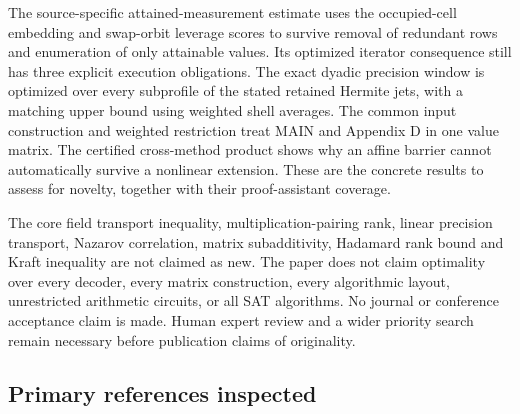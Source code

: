 \documentclass[
  11pt,
]{article}
\begin{document}
The source-specific attained-measurement estimate uses the occupied-cell
embedding and swap-orbit leverage scores to survive removal of redundant
rows and enumeration of only attainable values. Its optimized iterator
consequence still has three explicit execution obligations. The exact
dyadic precision window is optimized over every subprofile of the stated
retained Hermite jets, with a matching upper bound using weighted shell
averages. The common input construction and weighted restriction treat
MAIN and Appendix D in one value matrix. The certified cross-method
product shows why an affine barrier cannot automatically survive a
nonlinear extension. These are the concrete results to assess for
novelty, together with their proof-assistant coverage.

The core field transport inequality, multiplication-pairing rank, linear
precision transport, Nazarov correlation, matrix subadditivity, Hadamard
rank bound and Kraft inequality are not claimed as new. The paper does
not claim optimality over every decoder, every matrix construction,
every algorithmic layout, unrestricted arithmetic circuits, or all SAT
algorithms. No journal or conference acceptance claim is made. Human
expert review and a wider priority search remain necessary before
publication claims of originality.

\subsection{Primary references
inspected}\label{primary-references-inspected}
\end{document}

